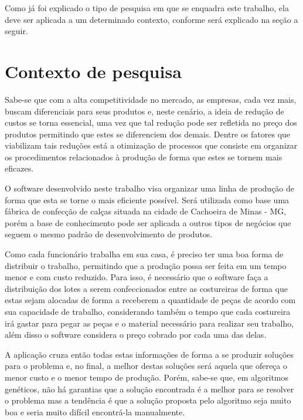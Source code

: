 \par Como já foi explicado o tipo de pesquisa em que se enquadra este trabalho,
ela deve ser aplicada a um determinado contexto, conforme será explicado na
seção a seguir.

\section{Contexto de pesquisa}

\par Sabe-se que com a alta competitividade no mercado, as empresas, cada vez mais,
buscam diferenciais para seus produtos e, neste cenário, a ideia
de redução de custos se torna essencial, uma vez que tal redução pode ser
refletida no preço dos produtos permitindo que estes se diferenciem dos demais.
Dentre os fatores que viabilizam tais reduções está a otimização de processos que
consiste em organizar os procedimentos relacionados à produção de forma que
estes se tornem mais eficazes.

\par O software desenvolvido neste trabalho visa organizar uma linha de produção
de forma que esta se torne o mais eficiente possível. Será utilizada como
base uma fábrica de confecção de calças situada na cidade de
Cachoeira de Minas - MG, porém a base de conhecimento pode ser aplicada a outros
tipos de negócios que seguem o mesmo padrão de desenvolvimento de produtos.

\par Como cada funcionário trabalha em sua casa, é preciso ter uma boa
forma de distribuir o trabalho, permitindo que a produção possa ser feita em um
tempo menor e com custo reduzido.
Para isso, é necessário que o software faça a distribuição dos lotes a
serem confeccionados entre as costureiras de forma que estas sejam
alocadas de forma a receberem a quantidade de peças de acordo com sua
capacidade de trabalho, considerando também o tempo que cada costureira
irá gastar para pegar as peças e o material necessário para realizar seu
trabalho, além disso o software considera o preço cobrado por cada uma das
delas.

\par A aplicação cruza então todas estas informações de forma a se produzir
soluções para o problema e, no final, a melhor destas soluções será aquela 
que ofereça o menor custo e o menor tempo de produção. Porém, sabe-se que, 
em algoritmos genéticos, não há garantias que a solução encontrada é a melhor
para se resolver o problema mas a tendência é que a solução proposta pelo
algoritmo seja muito boa e seria muito difícil encontrá-la manualmente. 

